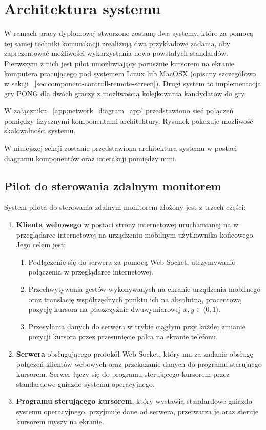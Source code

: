 \section{Architektura systemu}

W ramach pracy dyplomowej stworzone zostaną dwa systemy, które za pomocą tej samej techniki komunikacji zrealizują dwa przykładowe zadania, aby zaprezentować możliwości wykorzystania nowo powstałych standardów. Pierwszym z nich jest pilot umożliwiający porusznie kursorem na ekranie komputera pracującego pod systemem Linux lub MacOSX (opisany szczegółowo w sekcji ~\ref{sec:component-controll-remote-screen}). Drugi system to implementacja gry PONG dla dwóch graczy z możliwością kolejkowania kandydatów do gry.


W załączniku ~\ref{app:network_diagram_app} przedstawiono sieć połączeń pomiędzy fizycznymi komponentami architektury. Rysunek pokazuje możliwość skalowalności systemu.


W niniejszej sekcji zostanie przedstawiona architektura systemu w postaci diagramu komponentów oraz interakcji pomiędzy nimi.

\subsection{Pilot do sterowania zdalnym monitorem}

System pilota do sterowania zdalnym monitorem złożony jest z trzech części:

\begin{enumerate}
  \item \textbf{Klienta webowego} w postaci strony internetowej uruchamianej na w przeglądarce internetowej na urządzeniu mobilnym użytkownika końcowego. Jego celem jest:
  \begin{enumerate}
    \item Podłączenie się do serwera za pomocą Web Socket, utrzymywanie połączenia w przeglądarce internetowej.
    \item Przechwytywania gestów wykonywanych na ekranie urządzenia mobilnego oraz translację współrzędnych punktu ich na absolutną, procentową pozycję kursora na płaszczyźnie dwuwymiarowej \( x, y \in \langle0, 1\rangle \).
    \item Przesyłania danych do serwera w trybie ciągłym przy każdej zmianie pozycji kursora przez przesunięcie palca na ekranie telefonu.
  \end{enumerate}
  
 \item \textbf{Serwera} obsługującego protokół Web Socket, który ma za zadanie obsługę połączeń klientów webowych oraz przekazanie danych do programu sterująego kursorem. Serwer łączy się do programu sterującego kursorem przez standardowe gniazdo systemu operacyjnego.
 
 \item \textbf{Programu sterującego kursorem}, który wystawia standardowe gniazdo systemu operacyjnego, przyjmuje dane od serwera, przetwarza je oraz steruje kursorem myszy na ekranie.
\end{enumerate}


